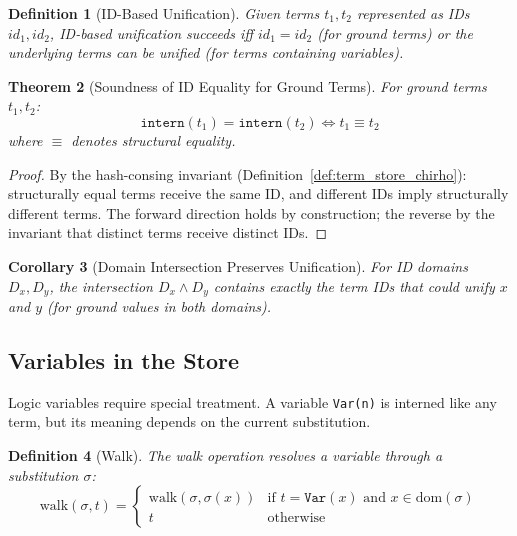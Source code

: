 \documentclass[11pt,a4paper]{article}
\newtheorem{theorem}{Theorem}
\newtheorem{definition}[theorem]{Definition}
\newtheorem{corollary}[theorem]{Corollary}
\begin{document}
\begin{definition}[ID-Based Unification]
\label{def:id_unify_chirho}
Given terms $t_1, t_2$ represented as IDs $id_1, id_2$, ID-based unification succeeds
iff $id_1 = id_2$ (for ground terms) or the underlying terms can be unified
(for terms containing variables).
\end{definition}

\begin{theorem}[Soundness of ID Equality for Ground Terms]
\label{thm:id_soundness_chirho}
For ground terms $t_1, t_2$:
\[
\texttt{intern}(t_1) = \texttt{intern}(t_2) \Leftrightarrow t_1 \equiv t_2
\]
where $\equiv$ denotes structural equality.
\end{theorem}

\begin{proof}
By the hash-consing invariant (Definition~\ref{def:term_store_chirho}): structurally
equal terms receive the same ID, and different IDs imply structurally different terms.
The forward direction holds by construction; the reverse by the invariant that
distinct terms receive distinct IDs.
\end{proof}

\begin{corollary}[Domain Intersection Preserves Unification]
\label{cor:domain_intersection_chirho}
For ID domains $D_x, D_y$, the intersection $D_x \land D_y$ contains exactly the
term IDs that could unify $x$ and $y$ (for ground values in both domains).
\end{corollary}

\subsection{Variables in the Store}

Logic variables require special treatment.
A variable \texttt{Var(n)} is interned like any term, but its meaning depends on
the current substitution.

\begin{definition}[Walk]
\label{def:walk_chirho}
The \emph{walk} operation resolves a variable through a substitution $\sigma$:
\[
\text{walk}(\sigma, t) = \begin{cases}
  \text{walk}(\sigma, \sigma(x)) & \text{if } t = \texttt{Var}(x) \text{ and } x \in \text{dom}(\sigma) \\
  t & \text{otherwise}
\end{cases}
\]
\end{definition}
\end{document}
